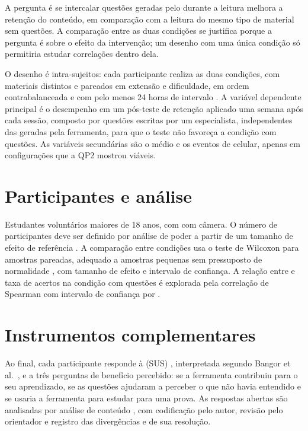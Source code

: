 A pergunta é se intercalar questões geradas pelo \ferramenta durante a leitura melhora a retenção do conteúdo, em comparação com a leitura do mesmo tipo de material sem questões. A comparação entre as duas condições se justifica porque a pergunta é sobre o efeito da intervenção; um desenho com uma única condição só permitiria estudar correlações dentro dela.

O desenho é intra-sujeitos: cada participante realiza as duas condições, com materiais distintos e pareados em extensão e dificuldade, em ordem contrabalanceada e com pelo menos 24 horas de intervalo \cite{WRH12}. A variável dependente principal é o desempenho em um pós-teste de retenção aplicado uma semana após cada sessão, composto por questões escritas por um especialista, independentes das geradas pela ferramenta, para que o teste não favoreça a condição com questões. As variáveis secundárias são o \fs médio e os eventos de celular, apenas em configurações que a QP2 mostrou viáveis.

\section{Participantes e análise}

Estudantes voluntários maiores de 18 anos, com  com câmera. O número de participantes deve ser definido por análise de poder a partir de um tamanho de efeito de referência . A comparação entre condições usa o teste de Wilcoxon para amostras pareadas, adequado a amostras pequenas sem pressuposto de normalidade \cite{Fie13}, com tamanho de efeito e intervalo de confiança. A relação entre \fs e taxa de acertos na condição com questões é explorada pela correlação de Spearman com intervalo de confiança por .

\section{Instrumentos complementares}

Ao final, cada participante responde à  (SUS) \cite{Bro96}, interpretada segundo Bangor et al.\ \cite{BKM08}, e a três perguntas de benefício percebido: se a ferramenta contribuiu para o seu aprendizado, se as questões ajudaram a perceber o que não havia entendido e se usaria a ferramenta para estudar para uma prova. As respostas abertas são analisadas por análise de conteúdo \cite{Bar11}, com codificação pelo autor, revisão pelo orientador e registro das divergências e de sua resolução.
